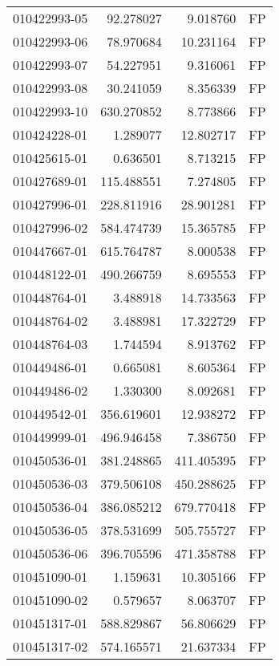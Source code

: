 \begin{tabular}{lrrl}
010422993-05 &   92.278027 &       9.018760 &   FP \\
010422993-06 &   78.970684 &      10.231164 &   FP \\
010422993-07 &   54.227951 &       9.316061 &   FP \\
010422993-08 &   30.241059 &       8.356339 &   FP \\
010422993-10 &  630.270852 &       8.773866 &   FP \\
010424228-01 &    1.289077 &      12.802717 &   FP \\
010425615-01 &    0.636501 &       8.713215 &   FP \\
010427689-01 &  115.488551 &       7.274805 &   FP \\
010427996-01 &  228.811916 &      28.901281 &   FP \\
010427996-02 &  584.474739 &      15.365785 &   FP \\
010447667-01 &  615.764787 &       8.000538 &   FP \\
010448122-01 &  490.266759 &       8.695553 &   FP \\
010448764-01 &    3.488918 &      14.733563 &   FP \\
010448764-02 &    3.488981 &      17.322729 &   FP \\
010448764-03 &    1.744594 &       8.913762 &   FP \\
010449486-01 &    0.665081 &       8.605364 &   FP \\
010449486-02 &    1.330300 &       8.092681 &   FP \\
010449542-01 &  356.619601 &      12.938272 &   FP \\
010449999-01 &  496.946458 &       7.386750 &   FP \\
010450536-01 &  381.248865 &     411.405395 &   FP \\
010450536-03 &  379.506108 &     450.288625 &   FP \\
010450536-04 &  386.085212 &     679.770418 &   FP \\
010450536-05 &  378.531699 &     505.755727 &   FP \\
010450536-06 &  396.705596 &     471.358788 &   FP \\
010451090-01 &    1.159631 &      10.305166 &   FP \\
010451090-02 &    0.579657 &       8.063707 &   FP \\
010451317-01 &  588.829867 &      56.806629 &   FP \\
010451317-02 &  574.165571 &      21.637334 &   FP \\

\end{tabular}
